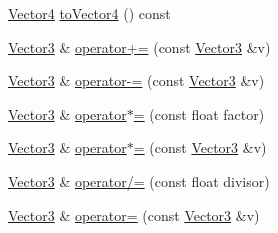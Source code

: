 \begin{DoxyCompactItemize}
\item 
\hyperlink{classprism_1_1_vector4}{Vector4} \hyperlink{classprism_1_1_vector3_a28ec8653ad976a191c08d6607fbb7138}{to\+Vector4} () const 
\item 
\hyperlink{classprism_1_1_vector3}{Vector3} \& \hyperlink{classprism_1_1_vector3_afd6e95b590f8db5d9b74475fa965b794}{operator+=} (const \hyperlink{classprism_1_1_vector3}{Vector3} \&v)
\item 
\hyperlink{classprism_1_1_vector3}{Vector3} \& \hyperlink{classprism_1_1_vector3_a95dfc688966152d050412723bae5d320}{operator-\/=} (const \hyperlink{classprism_1_1_vector3}{Vector3} \&v)
\item 
\hyperlink{classprism_1_1_vector3}{Vector3} \& \hyperlink{classprism_1_1_vector3_aea3ae3a304e2ca392967db184ac8c2c5}{operator$\ast$=} (const float factor)
\item 
\hyperlink{classprism_1_1_vector3}{Vector3} \& \hyperlink{classprism_1_1_vector3_a1412b906c23dc4e42b4d4e7f5af7a173}{operator$\ast$=} (const \hyperlink{classprism_1_1_vector3}{Vector3} \&v)
\item 
\hyperlink{classprism_1_1_vector3}{Vector3} \& \hyperlink{classprism_1_1_vector3_ad09fd09b96918097b3676e92fbde8a2e}{operator/=} (const float divisor)
\item 
\hyperlink{classprism_1_1_vector3}{Vector3} \& \hyperlink{classprism_1_1_vector3_a4b13e5314c8971e9b3effce874f99dd8}{operator=} (const \hyperlink{classprism_1_1_vector3}{Vector3} \&v)
\end{DoxyCompactItemize}
